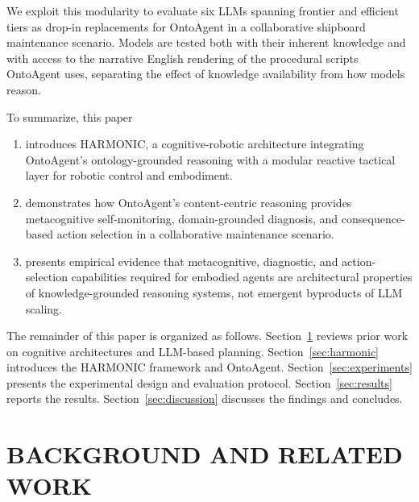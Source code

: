 \documentclass[letterpaper, 10 pt, conference]{ieeeconf}  %
\begin{document}
We exploit this modularity to evaluate six LLMs spanning frontier and efficient tiers as drop-in replacements for OntoAgent in a collaborative shipboard maintenance scenario. Models are tested both with their inherent knowledge and with access to the narrative English rendering of the procedural scripts OntoAgent uses, separating the effect of knowledge availability from how models reason.

To summarize, this paper
\begin{enumerate}[leftmargin=1.2em]
    \item introduces HARMONIC, a cognitive-robotic architecture integrating OntoAgent's ontology-grounded reasoning with a modular reactive tactical layer for robotic control and embodiment.
    \item demonstrates how OntoAgent's content-centric reasoning provides metacognitive self-monitoring, domain-grounded diagnosis, and consequence-based action selection in a collaborative maintenance scenario.
    \item presents empirical evidence that metacognitive, diagnostic, and action-selection capabilities required for embodied agents are architectural properties of knowledge-grounded reasoning systems, not emergent byproducts of LLM scaling.
\end{enumerate}

The remainder of this paper is organized as follows. Section~\ref{sec:related_work} reviews prior work on 
cognitive architectures and LLM-based planning. Section~\ref{sec:harmonic} introduces the HARMONIC framework and OntoAgent. Section~\ref{sec:experiments} presents the experimental 
design and evaluation protocol. Section~\ref{sec:results} reports the results. Section~\ref{sec:discussion} discusses the findings 
and concludes.


\section{BACKGROUND AND RELATED WORK}
\label{sec:related_work}
\end{document}
